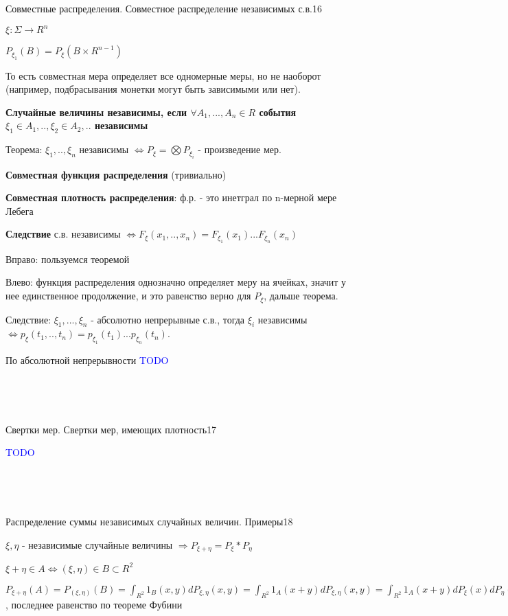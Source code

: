 \documentclass{article}
\begin{document}
~\

~\

\begin{question}{Совместные распределения. Совместное распределение независимых с.в.}{16}

$\xi : \Sigma \rightarrow R^n$

$P_{\xi_1}(B) = P_{\xi}(B \times R^{n - 1})$

То есть совместная мера определяет все одномерные меры, но не наоборот (например, подбрасывания монетки могут быть зависимыми или нет).

\textbf{Случайные величины независимы, если $\forall A_1, ..., A_n \in R$ события $\xi_1 \in A_1, .., \xi_2 \in A_2, ..$ независимы}

Теорема: $\xi_1, .., \xi_n$ независимы $\Leftrightarrow P_\xi = \bigotimes{P_{\xi_i}}$ - произведение мер.

\textbf{Совместная функция распределения} (тривиально)

\textbf{Совместная плотность распределения}: ф.р. - это инетграл по n-мерной мере Лебега

\textbf{Следствие} с.в. независимы $\Leftrightarrow F_\xi (x_1, .., x_n) = F_{\xi_1} (x_1) ... F_{\xi_n} (x_n)$

Вправо: пользуемся теоремой

Влево: функция распределения однозначно определяет меру на ячейках, значит у нее единственное продолжение, и это равенство верно для $P_\xi$, дальше теорема. 

Следствие: $\xi_1, ..., \xi_n$ - абсолютно непрерывные с.в., тогда $\xi_i$ независимы $\Leftrightarrow p_\xi(t_1, .., t_n) = p_{\xi_1}(t_1) ... p_{\xi_n}(t_n)$.

По абсолютной непрерывности \textcolor{blue}{TODO}

\end{question}

~\

~\

\begin{question}{Свертки мер. Свертки мер, имеющих плотность}{17}

\textcolor{blue}{TODO}

\end{question}

~\

~\

\begin{question}{Распределение суммы независимых случайных величин. Примеры}{18}

$\xi, \eta$ - независимые случайные величины $\Rightarrow P_{\xi + \eta} = P_{\xi} * P_\eta$

$\xi + \eta \in A \Leftrightarrow (\xi, \eta) \in B \subset R^2$

$P_{\xi + \eta}(A) = P_{(\xi, \eta)}(B) = \int_{R^2}{1_B(x, y)dP_{\xi, \eta}(x, y)} = \int_{R^2}{1_A(x + y)dP_{\xi, \eta}(x, y)} = \int_{R^2}{1_A(x + y)dP_\xi(x) dP_\eta(y)}$, последнее равенство по теореме Фубини

\end{question}
\end{document}
